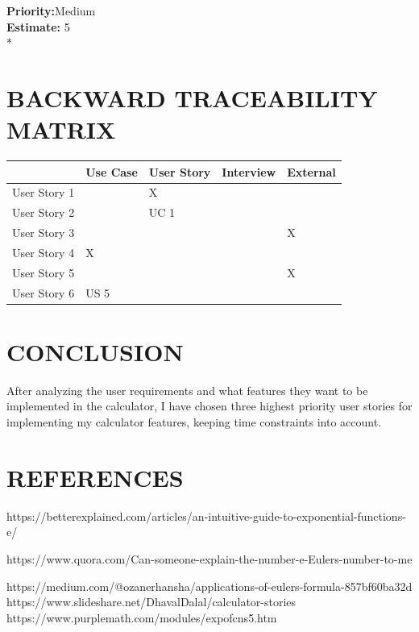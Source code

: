 \documentclass[12pt]{article}
\begin{document}
\noindent \textbf {Priority:}Medium\\[0.4cm]
\newline
\noindent \textbf {Estimate:} 5\\*
\newline
\section*{BACKWARD TRACEABILITY MATRIX}  %
\newline
\centering
\begin{tabular}{ |p{3cm}||p{2cm}|p{2cm}|p{2cm}|p{2cm}|  }

 \hline
 
  & Use Case & User Story & Interview & External\\[0.5cm] \hline
 \hline

User Story 1    &   &   X &   &  \\[0.5cm] \hline
User Story 2    &   & UC 1  &   &\\[0.5cm] \hline
User Story 3    &   &   &   & X \\[0.5cm] \hline
User Story 4    & X  &   &   & \\[0.5cm] \hline
User Story 5    &   &   &   & X \\[0.5cm] \hline
User Story 6    &  US 5 &   &   & \\[0.5cm] \hline
 \hline
\end{tabular}
\newpage
\section*{CONCLUSION}  %
\raggedright After analyzing the user requirements and what features they want to be implemented in the  calculator, I have chosen three  highest priority  user stories for implementing my calculator features, keeping time constraints into account.
\section*{REFERENCES}  %

\begingroup
\renewcommand{\section}[2]{}%
\begin{thebibliography}{}
https://betterexplained.com/articles/an-intuitive-guide-to-exponential-functions-e/
 
https://www.quora.com/Can-someone-explain-the-number-e-Eulers-number-to-me
 
https://medium.com/@ozanerhansha/applications-of-eulers-formula-857bf60ba32d
https://www.slideshare.net/DhavalDalal/calculator-stories
https://www.purplemath.com/modules/expofcns5.htm
\end{thebibliography}
\end{document}
